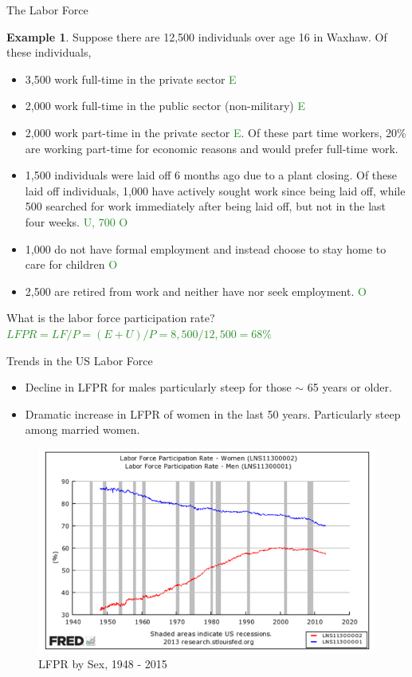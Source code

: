 \documentclass[xcolor={dvipsnames},pdf, hyperref={colorlinks=true, citecolor=ForestGreen, linkcolor=BlueViolet, urlcolor=Magenta}]{beamer}
\theoremstyle{definition}
\newtheorem{exmp}{Example}[section]
\newcommand{\ddp}[1]{{\textcolor{ForestGreen}{#1}}}
\begin{document}
\begin{frame}{The Labor Force}
\begin{exmp}
	\scriptsize
Suppose there are 12,500 individuals over age 16 in Waxhaw. Of these individuals,

\begin{itemize}
	\item 3,500 work full-time in the private sector \ddp{\pause E}
	\item 2,000 work full-time in the public sector (non-military) \ddp{\pause E}
	\item 2,000 work part-time in the private sector \ddp{\pause E}. Of these part time workers, 20\% are working part-time for economic reasons and would prefer full-time work.
	\item 1,500 individuals were laid off 6 months ago due to a plant closing. Of these laid off individuals, 1,000 have actively sought work since being laid off, while 500 searched for work immediately after being laid off, but not in the last four weeks. \ddp{ U, 700 O}
	\item 1,000 do not have formal employment and instead choose to stay home to care for children \ddp{\pause O}
	\item 2,500 are retired from work and neither have nor seek employment. \ddp{\pause O}
\end{itemize}
 What is the labor force participation rate?
\ddp{\pause $LFPR = LF/P = (E + U)/P = 8,500/12,500 = 68\%$}
\end{exmp}
\end{frame}

	\begin{frame}{Trends in the US Labor Force}
	\begin{itemize}
		\item Decline in LFPR for males particularly steep for those $\sim$ 65 years or older. 
		\item Dramatic increase in LFPR of women in the last 50 years. Particularly steep among married women.
	\end{itemize}	
	\begin{figure}
		\centering
		\includegraphics[scale=.8]{01B_5.png}
		\caption{LFPR by Sex, 1948 - 2015}
	\end{figure}
\end{frame}
\end{document}
